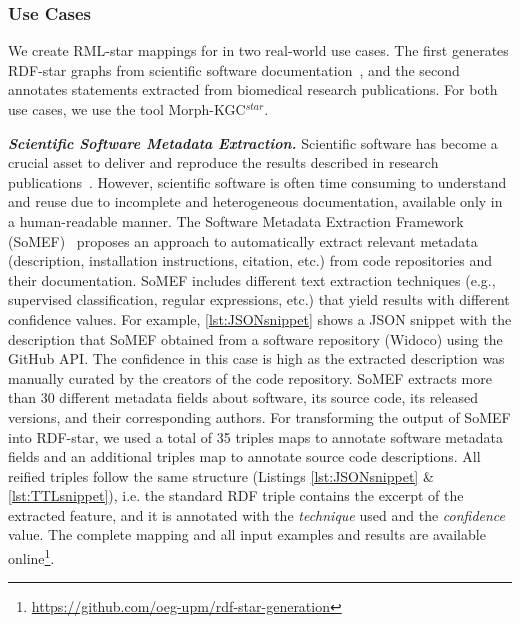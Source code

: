 \subsubsection{Use Cases}
\label{sec:chp4_star_usecases}

We create RML-star mappings for in two real-world use cases. 
The first generates \mbox{RDF-star} graphs from scientific software documentation~, 
and the second annotates statements extracted from biomedical research publications. 
For both use cases, we use the tool \mbox{Morph-KGC$^{star}$}. 















\noindent\textbf{\textit{Scientific Software Metadata Extraction.}}
Scientific software has become a crucial asset to deliver and reproduce the results described in research publications~\cite{chue_hong_fair_2021}. However, scientific software is often time consuming to understand and reuse due to incomplete and heterogeneous documentation, available only in a human-readable manner.
The Software Metadata Extraction Framework (SoMEF)~\cite{somef} proposes an approach to automatically extract relevant metadata (description, installation instructions, citation, etc.) from code repositories and their documentation. SoMEF includes different text extraction techniques (e.g., supervised classification, regular expressions, etc.) that yield results with different confidence values.
For example, \cref{lst:JSONsnippet} shows a JSON snippet with the description that SoMEF obtained from a software repository (Widoco) using the GitHub API.
The confidence in this case is high as the extracted description was manually curated by the creators of the code repository.
SoMEF extracts more than 30 different metadata fields about 
software, its source code, its released versions, and their corresponding authors. For transforming the output of SoMEF into RDF-star, we used a total of 35 triples maps to annotate software metadata fields and an additional triples map to annotate source code descriptions. All reified triples follow the same structure (Listings \ref{lst:JSONsnippet} \& \ref{lst:TTLsnippet}), i.e. the standard RDF triple contains the excerpt of the extracted feature, and it is annotated
with the \emph{technique} used and the \emph{confidence} value. 
The complete mapping and all input examples and results are available online\footnote{\url{https://github.com/oeg-upm/rdf-star-generation}}.
 
